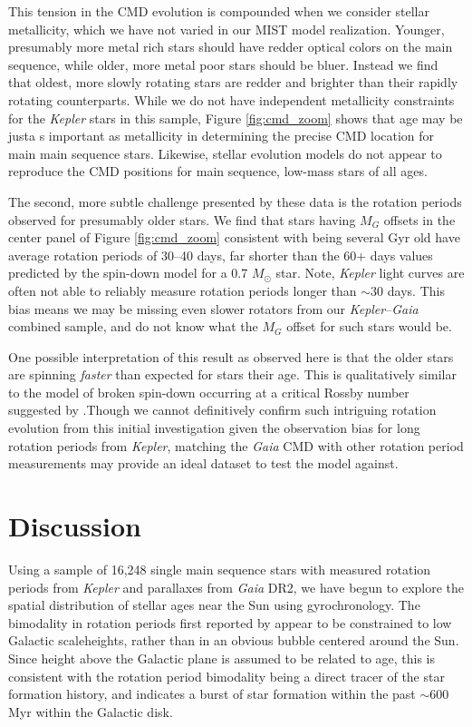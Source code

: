 \documentclass[preprint2]{aastex62}
\newcommand{\Kepler}{\textsl{Kepler}\xspace}
\begin{document}
This tension in the CMD evolution is compounded when we consider stellar metallicity, which we have not varied in our MIST model realization. Younger, presumably more metal rich stars should have redder optical colors on the main sequence, while older, more metal poor stars should be bluer. Instead we find that oldest, more slowly rotating stars are redder and brighter than their rapidly rotating counterparts. While we do not have independent metallicity constraints for the \Kepler stars in this sample, Figure \ref{fig:cmd_zoom} shows that age may be justa s important as metallicity in determining the precise CMD location for main main sequence stars. Likewise, stellar evolution models do not appear to reproduce the CMD positions for main sequence, low-mass stars of all ages.


The second, more subtle challenge presented by these data is the rotation periods observed for presumably older stars. 
We find that stars having $M_G$ offsets in the center panel of Figure \ref{fig:cmd_zoom} consistent with being several Gyr old have average rotation periods of 30--40 days, far shorter than the 60+ days values predicted by the spin-down model for a 0.7 $M_\odot$ star.  Note, \Kepler light curves are often not able to reliably measure rotation periods longer than $\sim$30 days. This bias means we may be missing even slower rotators from our \Kepler--{\em Gaia} combined sample, and do not know what the $M_G$ offset for such stars would be. 


One possible interpretation of this result as observed here is that the older stars are spinning {\it faster} than expected for stars their age. This is qualitatively similar to the model of broken spin-down occurring at a critical Rossby number suggested by \citet{van-saders2016}.Though we cannot definitively confirm such intriguing rotation evolution from this initial investigation given the observation bias for long rotation periods from \Kepler, matching the {\em Gaia} CMD with other rotation period measurements may provide an ideal dataset to test the \citet{van-saders2016} model against. 





\section{Discussion}

Using a sample of 16,248 single main sequence stars with measured rotation periods from \Kepler and parallaxes from {\em Gaia} DR2, we have begun to explore the spatial distribution of stellar ages near the Sun using gyrochronology. The bimodality in rotation periods first reported by \citet{mcquillan2013} appear to be constrained to low Galactic scaleheights, rather than in an obvious bubble centered around the Sun. Since height above the Galactic plane is assumed to be related to age, this is consistent with the rotation period bimodality being a direct tracer of the star formation history, and indicates a burst of star formation within the past $\sim$600 Myr within the Galactic disk.
\end{document}
